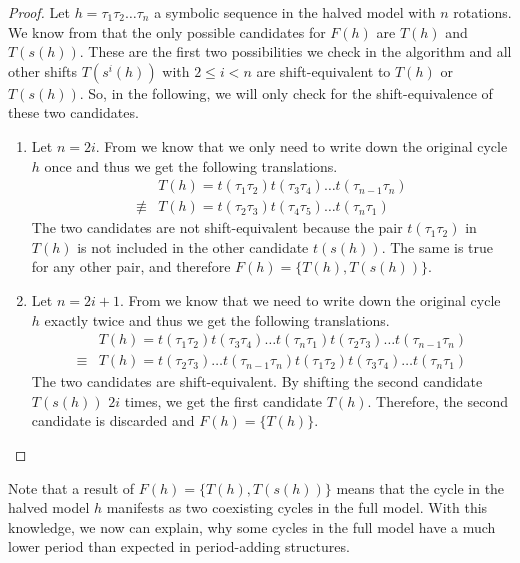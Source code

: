 \begin{proof}
	Let $h = \tau_1\tau_2 \dots \tau_n$ a symbolic sequence in the halved model with $n$ rotations.
	We know from  that the only possible candidates for $F(h)$ are $T(h)$ and $T(s(h))$.
	These are the first two possibilities we check in the algorithm and all other shifts $T(s^i(h))$ with $2 \leq i < n$ are shift-equivalent to $T(h)$ or $T(s(h))$.
	So, in the following, we will only check for the shift-equivalence of these two candidates.
	\begin{enumerate}
		\item Let $n = 2i$.
		      From  we know that we only need to write down the original cycle $h$ once and thus we get the following translations.
		      \begin{align*}
			              & T(h) = t(\tau_1\tau_2) t(\tau_3\tau_4) \dots t(\tau_{n-1}\tau_n) \\
			      \nequiv & T(h) = t(\tau_2\tau_3) t(\tau_4\tau_5) \dots t(\tau_n\tau_1)
		      \end{align*}
		      The two candidates are not shift-equivalent because the pair $t(\tau_1\tau_2)$ in $T(h)$ is not included in the other candidate $t(s(h))$.
		      The same is true for any other pair, and therefore $F(h) = \{T(h), T(s(h))\}$.
		\item Let $n = 2i + 1$.
		      From  we know that we need to write down the original cycle $h$ exactly twice and thus we get the following translations.
		      \begin{align*}
			             & T(h) = t(\tau_1\tau_2) t(\tau_3\tau_4) \dots t(\tau_n\tau_1) t(\tau_2\tau_3) \dots t(\tau_{n-1}\tau_n) \\
			      \equiv & T(h) = t(\tau_2\tau_3) \dots t(\tau_{n-1}\tau_n) t(\tau_1\tau_2) t(\tau_3\tau_4) \dots t(\tau_n\tau_1)
		      \end{align*}
		      The two candidates are shift-equivalent.
		      By shifting the second candidate $T(s(h))$ $2i$ times, we get the first candidate $T(h)$.
		      Therefore, the second candidate is discarded and $F(h) = \{T(h)\}$.
	\end{enumerate}
\end{proof}

Note that a result of $F(h) = \{T(h), T(s(h))\}$ means that the cycle in the halved model $h$ manifests as two coexisting cycles in the full model.
With this knowledge, we now can explain, why some cycles in the full model have a much lower period than expected in period-adding structures.

